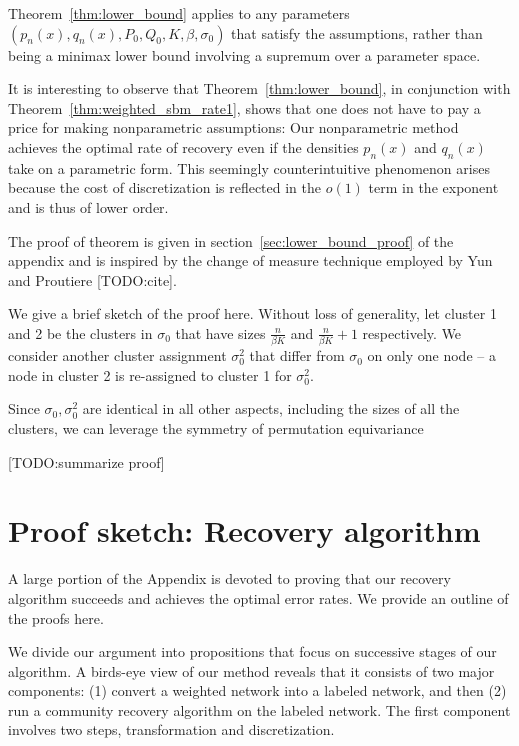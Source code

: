 \documentclass{article}
\begin{document}
Theorem~\ref{thm:lower_bound} applies to any parameters $(p_n(x), q_n(x), P_0, Q_0, K, \beta, \sigma_0)$ that satisfy the assumptions, rather than being a minimax lower bound involving a supremum over a parameter space.


\begin{remark}
It is interesting to observe that Theorem~\ref{thm:lower_bound}, in conjunction with Theorem~\ref{thm:weighted_sbm_rate1}, shows that one does not have to pay a price for making nonparametric assumptions: Our nonparametric method achieves the optimal rate of recovery even if the densities $p_n(x)$ and $q_n(x)$ take on a parametric form. This seemingly counterintuitive phenomenon arises because the cost of discretization is reflected in the $o(1)$ term in the exponent and is thus of lower order. 
\end{remark}


The proof of theorem is given in section~\ref{sec:lower_bound_proof} of the appendix and is inspired by the change of measure technique employed by Yun and Proutiere [TODO:cite].

We give a brief sketch of the proof here. Without loss of generality, let cluster 1 and 2 be the clusters in $\sigma_0$ that have sizes $\frac{n}{\beta K}$ and $\frac{n}{ \beta K}+1$ respectively. We consider another cluster assignment $\sigma_0^2$ that differ from $\sigma_0$ on only one node -- a node in cluster 2 is re-assigned to cluster 1 for $\sigma_0^2$. 

Since $\sigma_0, \sigma_0^2$ are identical in all other aspects, including the sizes of all the clusters, we can leverage the symmetry of permutation equivariance

[TODO:summarize proof]




\section{Proof sketch: Recovery algorithm}
\label{SecProofs}

A large portion of the Appendix is devoted to proving that our recovery algorithm succeeds and achieves the optimal error rates. We provide an outline of the proofs here.

We divide our argument into propositions that focus on successive stages of our algorithm. A birds-eye view of our method reveals that it consists of two major components: (1) convert a weighted network into a labeled network, and then (2) run a community recovery algorithm on the labeled network. The first component involves two steps, transformation and discretization. 
\end{document}
